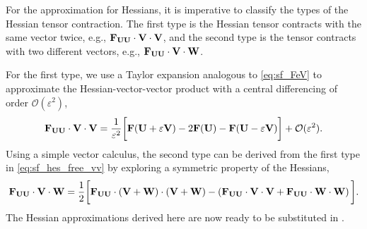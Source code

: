 For the approximation for Hessians, it is imperative to classify
the types of the Hessian tensor contraction.
The first type is the Hessian tensor contracts with the same vector twice, e.g., \( \mathbf{F}_{\mathbf{U}\mathbf{U}} \cdot \mathbf{V} \cdot \mathbf{V} \),
and the second type is the tensor contracts with
two different vectors, e.g., \( \mathbf{F}_{\mathbf{U}\mathbf{U}} \cdot \mathbf{V} \cdot \mathbf{W} \).

For the first type, we use a Taylor expansion analogous to \cref{eq:sf_FeV}
to approximate the Hessian-vector-vector product with
a central differencing of order \( \mathcal{O}(\varepsilon^{2}) \),
\begin{equation}\label{eq:sf_hes_free_vv}
    \mathbf{F}_{\mathbf{U} \mathbf{U}} \cdot \mathbf{V} \cdot \mathbf{V} = \frac{1}{\varepsilon^{2}}
    \bigg[ \mathbf{F}(\mathbf{U} + \varepsilon \mathbf{V}) -2\mathbf{F}(\mathbf{U}) -\mathbf{F}(\mathbf{U} - \varepsilon \mathbf{V}) \bigg]
    + \mathcal{O} ( \varepsilon^{2} ).
\end{equation}
Using a simple vector calculus,
the second type can be derived from the first type in \cref{eq:sf_hes_free_vv}
by exploring a symmetric property of the Hessians,
\begin{equation}\label{eq:sf_hes_free_vw}
        \mathbf{F}_{\mathbf{U} \mathbf{U}} \cdot \mathbf{V} \cdot \mathbf{W} = \frac{1}{2}
    \bigg[ \mathbf{F}_{\mathbf{U} \mathbf{U}} \cdot \left( \mathbf{V} + \mathbf{W} \right) \cdot \left( \mathbf{V} + \mathbf{W} \right) -
          \left( \mathbf{F}_{\mathbf{U} \mathbf{U}} \cdot \mathbf{V} \cdot \mathbf{V} + \mathbf{F}_{\mathbf{U} \mathbf{U}} \cdot \mathbf{W} \cdot \mathbf{W} \right) \bigg].
\end{equation}
The Hessian approximations derived here are now ready to be substituted
in .

